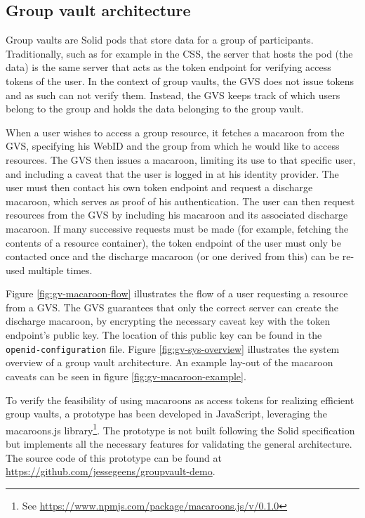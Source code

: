 \subsection{Group vault architecture}
Group vaults are Solid pods that store data for a group of participants. Traditionally, such as for example in the \acrlong{CSS}, the server that hosts the pod (the data) is the same server that acts as the token endpoint for verifying access tokens of the user. In the context of group vaults, the \gls{GVS} does not issue tokens and as such can not verify them. Instead, the \gls{GVS} keeps track of which users belong to the group and holds the data belonging to the group vault.

When a user wishes to access a group resource, it fetches a macaroon from the \gls{GVS}, specifying his WebID and the group from which he would like to access resources. The \gls{GVS} then issues a macaroon, limiting its use to that specific user, and including a caveat that the user is logged in at his identity provider. The user must then contact his own token endpoint and request a discharge macaroon, which serves as proof of his authentication. The user can then request resources from the \gls{GVS} by including his macaroon and its associated discharge macaroon. If many successive requests must be made (for example, fetching the contents of a resource container), the token endpoint of the user must only be contacted once and the discharge macaroon (or one derived from this) can be re-used multiple times. 

Figure \ref{fig:gv-macaroon-flow} illustrates the flow of a user requesting a resource from a \gls{GVS}. The \gls{GVS} guarantees that only the correct server can create the discharge macaroon, by encrypting the necessary caveat key with the token endpoint's public key. The location of this public key can be found in the \texttt{openid-configuration} file. Figure \ref{fig:gv-sys-overview} illustrates the system overview of a group vault architecture. An example lay-out of the macaroon caveats can be seen in figure \ref{fig:gv-macaroon-example}.

To verify the feasibility of using macaroons as access tokens for realizing efficient group vaults, a prototype has been developed in JavaScript, leveraging the macaroons.js library\footnote{See \url{https://www.npmjs.com/package/macaroons.js/v/0.1.0}}. The prototype is not built following the Solid specification but implements all the necessary features for validating the general architecture. The source code of this prototype can be found at \url{https://github.com/jessegeens/groupvault-demo}.

